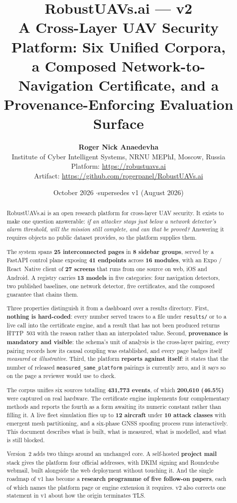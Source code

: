 \documentclass[11pt,a4paper]{article}
\title{%
  \vspace{-1cm}
  {\LARGE\bfseries RobustUAVs.ai --- v2}\\[6pt]
  {\large A Cross-Layer UAV Security Platform: Six Unified Corpora,\\
   a Composed Network-to-Navigation Certificate, and a\\
   Provenance-Enforcing Evaluation Surface}}
\author{%
  \textbf{Roger Nick Anaedevha}\\
  Institute of Cyber Intelligent Systems, NRNU MEPhI, Moscow, Russia\\[8pt]
  \normalsize Platform: \url{https://robustuavs.ai}\\
  Artifact: \url{https://github.com/rogerpanel/RobustUAVs.ai}}
\date{October 2026 \quad$\cdot$\quad supersedes v1 (August 2026)}
\newcommand{\code}[1]{\texttt{#1}}
\begin{document}
\maketitle
\thispagestyle{fancy}

\begin{abstract}
\noindent
RobustUAVs.ai is an open research platform for cross-layer UAV security. It
exists to make one question answerable: \emph{if an attacker stays just below a
network detector's alarm threshold, will the mission still complete, and can
that be proved?} Answering it requires objects no public dataset provides, so
the platform supplies them.

The system spans \textbf{25 interconnected pages} in \textbf{8 sidebar groups},
served by a FastAPI control plane exposing \textbf{41 endpoints} across
\textbf{16 modules}, with an Expo / React~Native client of \textbf{27 screens}
that runs from one source on web, iOS and Android. A registry carries
\textbf{13 models} in five categories: four navigation detectors, two published
baselines, one network detector, five certificates, and the composed guarantee
that chains them.

Three properties distinguish it from a dashboard over a results directory.
First, \textbf{nothing is hard-coded}: every number served traces to a file
under \code{results/} or to a live call into the certificate engine, and a
result that has not been produced returns HTTP~503 with the reason rather than
an interpolated value. Second, \textbf{provenance is mandatory and visible}: the
schema's unit of analysis is the cross-layer pairing, every pairing records how
its causal coupling was established, and every page badges itself
\emph{measured} or \emph{illustrative}. Third, the platform \textbf{reports
against itself}: it states that the number of released
\code{measured\_same\_platform} pairings is currently zero, and it says so on
the page a reviewer would use to check.

The corpus unifies six sources totalling \textbf{431,773 events}, of which
\textbf{200,610 (46.5\%)} were captured on real hardware. The certificate engine
implements four complementary methods and reports the fourth as a form awaiting
its numeric constant rather than filling it. A live fleet simulation flies up to
\textbf{12 aircraft} under \textbf{10 attack classes} with emergent mesh
partitioning, and a six-phase GNSS spoofing process runs interactively. This
document describes what is built, what is measured, what is modelled, and what
is still blocked.

Version~2 adds two things around an unchanged core. A self-hosted
\textbf{project mail} stack gives the platform four official addresses, with
DKIM signing and Roundcube webmail, built alongside the web deployment without
touching it. And the single roadmap of v1 has become a \textbf{research
programme of five follow-on papers}, each of which names the platform page or
engine extension it requires. v2 also corrects one statement in v1 about how the
origin terminates TLS.
\end{abstract}
\end{document}
